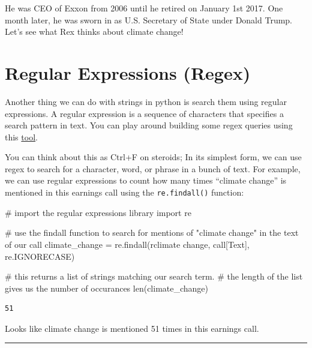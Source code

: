 \documentclass[
  letterpaper,
  DIV=11,
  numbers=noendperiod]{scrreprt}
\newenvironment{Shaded}{\begin{snugshade}}{\end{snugshade}}
\newcommand{\BuiltInTok}[1]{\textcolor[rgb]{0.00,0.23,0.31}{#1}}
\newcommand{\CommentTok}[1]{\textcolor[rgb]{0.37,0.37,0.37}{#1}}
\newcommand{\ImportTok}[1]{\textcolor[rgb]{0.00,0.46,0.62}{#1}}
\newcommand{\NormalTok}[1]{\textcolor[rgb]{0.00,0.23,0.31}{#1}}
\newcommand{\OperatorTok}[1]{\textcolor[rgb]{0.37,0.37,0.37}{#1}}
\newcommand{\StringTok}[1]{\textcolor[rgb]{0.13,0.47,0.30}{#1}}
\newcommand{\VerbatimStringTok}[1]{\textcolor[rgb]{0.13,0.47,0.30}{#1}}
\begin{document}
He was CEO of Exxon from 2006 until he retired on January 1st 2017. One
month later, he was sworn in as U.S. Secretary of State under Donald
Trump. Let's see what Rex thinks about climate change!

\hypertarget{regular-expressions-regex}{%
\section{Regular Expressions (Regex)}\label{regular-expressions-regex}}

Another thing we can do with strings in python is search them using
regular expressions. A regular expression is a sequence of characters
that specifies a search pattern in text. You can play around building
some regex queries using this \href{https://regexr.com/}{tool}.

You can think about this as Ctrl+F on steroids; In its simplest form, we
can use regex to search for a character, word, or phrase in a bunch of
text. For example, we can use regular expressions to count how many
times ``climate change'' is mentioned in this earnings call using the
\texttt{re.findall()} function:

\begin{Shaded}
\begin{Highlighting}[]
\CommentTok{\# import the regular expressions library }
\ImportTok{import}\NormalTok{ re}

\CommentTok{\# use the findall function to search for mentions of "climate change" in the text of our call}
\NormalTok{climate\_change }\OperatorTok{=}\NormalTok{ re.findall(}\VerbatimStringTok{r\textquotesingle{}climate change\textquotesingle{}}\NormalTok{, call[}\StringTok{\textquotesingle{}Text\textquotesingle{}}\NormalTok{], re.IGNORECASE)}

\CommentTok{\# this returns a list of strings matching our search term. }
\CommentTok{\# the length of the list gives us the number of occurances}
\BuiltInTok{len}\NormalTok{(climate\_change)}
\end{Highlighting}
\end{Shaded}

\begin{verbatim}
51
\end{verbatim}

Looks like climate change is mentioned 51 times in this earnings call.

\begin{center}\rule{0.5\linewidth}{0.5pt}\end{center}
\end{document}
